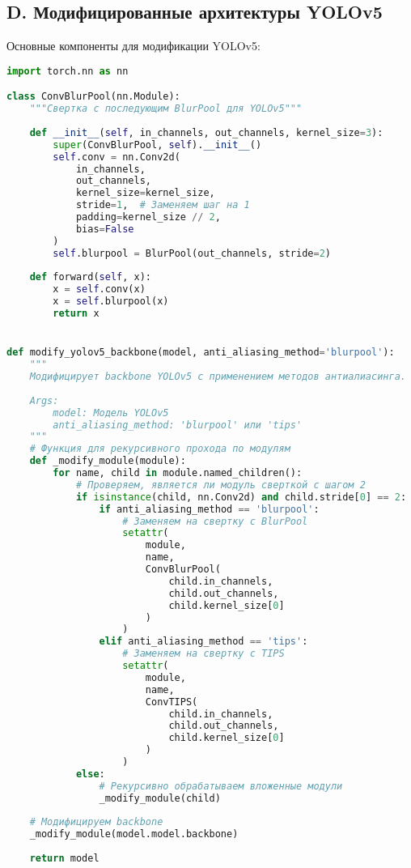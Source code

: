 \subsection*{D. Модифицированные архитектуры YOLOv5}
\label{appendix:yolo_code}

Основные компоненты для модификации YOLOv5:

\begin{lstlisting}[language=Python]
import torch.nn as nn

class ConvBlurPool(nn.Module):
    """Свертка с последующим BlurPool для YOLOv5"""
    
    def __init__(self, in_channels, out_channels, kernel_size=3):
        super(ConvBlurPool, self).__init__()
        self.conv = nn.Conv2d(
            in_channels, 
            out_channels, 
            kernel_size=kernel_size,
            stride=1,  # Заменяем шаг на 1
            padding=kernel_size // 2,
            bias=False
        )
        self.blurpool = BlurPool(out_channels, stride=2)
        
    def forward(self, x):
        x = self.conv(x)
        x = self.blurpool(x)
        return x


def modify_yolov5_backbone(model, anti_aliasing_method='blurpool'):
    """
    Модифицирует backbone YOLOv5 с применением методов антиалиасинга.
    
    Args:
        model: Модель YOLOv5
        anti_aliasing_method: 'blurpool' или 'tips'
    """
    # Функция для рекурсивного прохода по модулям
    def _modify_module(module):
        for name, child in module.named_children():
            # Проверяем, является ли модуль сверткой с шагом 2
            if isinstance(child, nn.Conv2d) and child.stride[0] == 2:
                if anti_aliasing_method == 'blurpool':
                    # Заменяем на свертку с BlurPool
                    setattr(
                        module, 
                        name, 
                        ConvBlurPool(
                            child.in_channels,
                            child.out_channels,
                            child.kernel_size[0]
                        )
                    )
                elif anti_aliasing_method == 'tips':
                    # Заменяем на свертку с TIPS
                    setattr(
                        module, 
                        name, 
                        ConvTIPS(
                            child.in_channels,
                            child.out_channels,
                            child.kernel_size[0]
                        )
                    )
            else:
                # Рекурсивно обрабатываем вложенные модули
                _modify_module(child)
    
    # Модифицируем backbone
    _modify_module(model.model.backbone)
    
    return model
\end{lstlisting}

